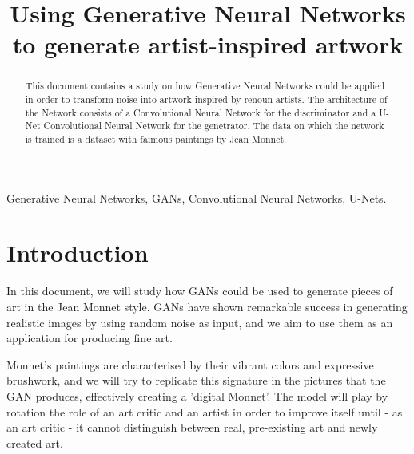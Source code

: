 \documentclass[conference]{IEEEtran}
\begin{document}
\title{Using Generative Neural Networks to generate artist-inspired artwork}

\author{
    \and
}
\maketitle

\begin{abstract}
    This document contains a study on how Generative Neural Networks could be applied in order to transform noise into artwork
    inspired by renoun artists. The architecture of the Network consists of a Convolutional Neural Network for the discriminator
    and a U-Net Convolutional Neural Network for the genetrator. The data on which the network is trained is a dataset with
    faimous paintings by Jean Monnet.   
\end{abstract}

\begin{IEEEkeywords}
    Generative Neural Networks, GANs, Convolutional Neural Networks, U-Nets.
\end{IEEEkeywords}

\section{Introduction}
    In this document, we will study how GANs could be used to generate pieces of art in the Jean Monnet style. GANs have shown
remarkable success in generating realistic images by using random noise as input, and we aim to use them as an application
for producing fine art.

    Monnet's paintings are characterised by their vibrant colors and expressive brushwork, and we will try to replicate this
signature in the pictures that the GAN produces, effectively creating a 'digital Monnet'. The model will play by rotation
the role of an art critic and an artist in order to improve itself until - as an art critic - it cannot distinguish between
real, pre-existing art and newly created art.
\end{document}
